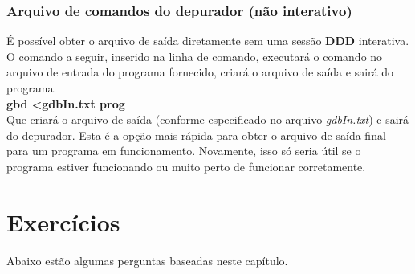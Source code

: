 \subsubsection{Arquivo de comandos do depurador (não interativo)}
É possível obter o arquivo de saída diretamente sem uma sessão \textbf{DDD} interativa. O comando a seguir, inserido na linha de comando, executará o comando no arquivo de entrada do programa fornecido, criará o arquivo de saída e sairá do programa.\\
\textbf{gbd <gdbIn.txt prog}\\
Que criará o arquivo de saída (conforme especificado no arquivo \textit{gdbIn.txt}) e sairá do depurador. Esta é a opção mais rápida para obter o arquivo de saída final para um programa em funcionamento. Novamente, isso só seria útil se o programa estiver funcionando ou muito perto de funcionar corretamente.

\section{Exercícios}
Abaixo estão algumas perguntas baseadas neste capítulo.

